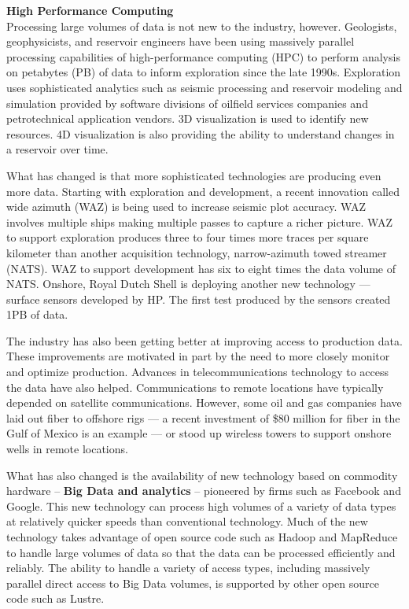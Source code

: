 \documentclass[twocolumn]{article}
\begin{document}
\noindent
\textbf{High Performance Computing}\\
Processing large volumes of data is not new to the industry, however. Geologists, geophysicists, and reservoir engineers have been using massively parallel processing capabilities of high-performance computing (HPC) to perform analysis on petabytes (PB) of data to inform exploration since the late 1990s. Exploration uses sophisticated analytics such as seismic processing and reservoir modeling and simulation provided by software divisions of oilfield services companies and petrotechnical application vendors. 3D visualization is used to identify new resources. 4D visualization is also providing the ability to understand changes in a reservoir over time.

What has changed is that more sophisticated technologies are producing even more data. Starting with exploration and development, a recent innovation called wide azimuth (WAZ) is being used to increase seismic plot accuracy. WAZ involves multiple ships making multiple passes to capture a richer picture. WAZ to support exploration produces three to four times more traces per square kilometer than another acquisition technology, narrow-azimuth towed streamer (NATS). WAZ to support development has six to eight times the data volume of NATS. Onshore, Royal Dutch Shell is deploying another new technology — surface sensors developed by HP. The first test produced by the sensors created 1PB of data.

The industry has also been getting better at improving access to production data. These improvements are motivated in part by the need to more closely monitor and optimize production. Advances in telecommunications technology to access the data have also helped. Communications to remote locations have typically depended on satellite communications. However, some oil and gas companies have laid out fiber to offshore rigs — a recent investment of \$80 million for fiber in the Gulf of Mexico is an example — or stood up wireless towers to support onshore wells in remote locations.

What has also changed is the availability of new technology based on commodity hardware -- \textbf{Big Data and analytics} -- pioneered by firms such as Facebook and Google. This new technology can process high volumes of a variety of data types at relatively quicker speeds than conventional technology. Much of the new technology takes advantage of open source code such as Hadoop and MapReduce to handle large volumes of data so that the data can be processed efficiently and reliably. The ability to handle a variety of access types, including massively parallel direct access to Big Data volumes, is supported by other open source code such as Lustre.
\\
\end{document}
